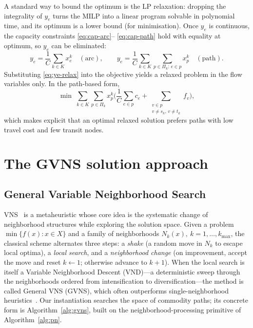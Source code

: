 \documentclass[runningheads]{llncs}
\begin{document}
A standard way to bound the optimum is the LP relaxation: dropping the
integrality of $y_e$ turns the MILP into a linear program solvable in
polynomial time, and its optimum is a lower bound (for minimisation). Once
$y_e$ is continuous, the capacity constraints \eqref{eq:cap-arc}--%
\eqref{eq:cap-path} hold with equality at optimum, so $y_e$ can be eliminated:
\begin{equation}
y_e=\frac1C\sum_{k\in K} x^k_e \quad(\text{arc}), \qquad
y_e=\frac1C\sum_{k\in K}\sum_{p\in\Pi_k:\,e\in p} x^k_p \quad(\text{path}).
\label{eq:ye-relax}
\end{equation}
Substituting \eqref{eq:ye-relax} into the objective yields a relaxed problem
in the flow variables only. In the path-based form,
\begin{equation}
\min\;\sum_{k\in K}\sum_{p\in\Pi_k} x^k_p
\Bigg(\frac1C\sum_{e\in p} c_e+\sum_{\substack{v\in p\\ v\neq s_k,\,v\neq t_k}}
f_v\Bigg),
\label{eq:relax-path}
\end{equation}
which makes explicit that an optimal relaxed solution prefers paths with low
travel cost and few transit nodes.

\section{The GVNS solution approach}
\label{sec:gvns}

\subsection{General Variable Neighborhood Search}
VNS~\cite{hansen2019,hansen2017} is a metaheuristic whose core idea is the
systematic change of neighborhood structures while exploring the solution space.
Given a problem $\min\{f(x):x\in X\}$ and a family of neighborhoods
$N_k(x),\ k=1,\dots,k_{\max}$, the classical scheme alternates three steps: a
\emph{shake} (a random move in $N_k$ to escape local optima), a \emph{local
search}, and a \emph{neighborhood change} (on improvement, accept the move and
reset $k\!\gets\!1$; otherwise advance to $k\!+\!1$). When the local search is
itself a Variable Neighborhood Descent (VND)---a deterministic sweep through the
neighborhoods ordered from intensification to diversification---the method is
called General VNS (GVNS), which often outperforms single-neighborhood
heuristics~\cite{karakostas2019,mjirda2014}. Our instantiation searches the space
of commodity paths; its concrete form is Algorithm~\ref{alg:gvns}, built on the
neighborhood-processing primitive of Algorithm~\ref{alg:pn}.
\end{document}
